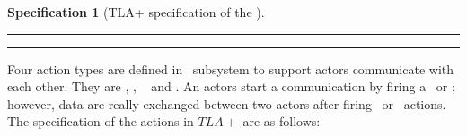 \documentclass[a4paper,11pt]{article}
\theoremstyle{break}
\newtheorem{TLA}{Specification}
\begin{document}
\begin{itemize}[noitemsep]
\begin{TLA}[TLA+ specification of the \Mailboxes]
	\par\noindent\rule{\textwidth}{0.4pt}
\begin{tlatex}

\end{tlatex}
\par\noindent\rule{\textwidth}{0.4pt}
\end{TLA}
\end{itemize}
Four action types are defined in \Network~subsystem to support actors communicate with each other. They are \asynsend, \asynreceive, \wait~ and \test. An actors start a communication by firing a \asynsend~or \asynreceive; however, data are really exchanged between two actors after firing \wait~or \test~actions. The specification of the actions in $TLA+$ are as follows:     
\end{document}
